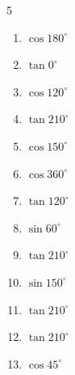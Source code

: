 \begin{multicols}{5}
\begin{enumerate}
  \item $\displaystyle \cos{180^\circ}$

        \phantom{$\displaystyle =-1$}

  \item $\displaystyle \tan{0^\circ}$

        \phantom{$\displaystyle =0$}

  \item $\displaystyle \cos{120^\circ}$


  \item $\displaystyle \tan{210^\circ}$


\columnbreak %

  \item $\displaystyle \cos{150^\circ}$


  \item $\displaystyle \cos{360^\circ}$

        \phantom{$\displaystyle =1$}

  \item $\displaystyle \tan{120^\circ}$


  \item $\displaystyle \sin{60^\circ}$


  \item $\displaystyle \tan{210^\circ}$


  \item $\displaystyle \sin{150^\circ}$


  \item $\displaystyle \tan{210^\circ}$


  \item $\displaystyle \tan{210^\circ}$


  \item $\displaystyle \cos{45^\circ}$


\end{enumerate}
\end{multicols}
